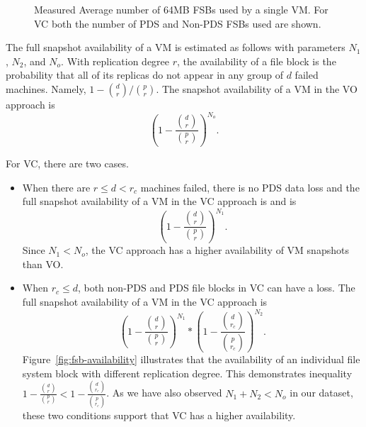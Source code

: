 \begin{figure}[htbp]
  \centering
  \caption{Measured Average number of 64MB FSBs used by a single VM. For VC both the number of PDS and Non-PDS FSBs used are shown.}
  \label{fig:vm-links}
\end{figure}

The full snapshot availability of a VM is estimated as follows with parameters $N_1$, $N_2$, and $N_o$.
With replication degree $r$, the availability of a file block is the probability that  
all of its replicas do not appear in any group of $d$ failed machines. 
Namely, $1-\binom{d}{r}/ \binom{p}{r}$. 
The snapshot availability of a VM  in the VO approach is
\begin{equation}
\label{eq:VO}
(1-\frac{ \binom{d}{r}} { \binom{p}{r} })^{N_o}. 
\end{equation}

For VC, there are two cases.
\begin{itemize}
\item
When there are $r \le d<r_c$ machines failed,  there is no PDS data loss and  
the full snapshot availability of a VM in the VC approach is 
and is
\[
(1-\frac{\binom{d}{r}} { \binom{p}{r} })^{N_1}.
\]
Since $N_1 <N_o$, the VC approach has a higher availability of VM snapshots than VO.

\item
When $r_c \leq d$, both non-PDS and PDS file blocks in VC can have a loss.
The full snapshot availability of  a VM in the VC approach is
\[
(1-\frac{ \binom{d}{r}} { \binom{p}{r} })^{N_1} 
*
(1-\frac{ \binom{d}{r_c}} { \binom{p}{r_c} })^{N_2}.
\]
Figure~\ref{fig:fsb-availability} illustrates that the availability of an individual file system block
with different replication degree. This demonstrates inequality $1-\frac{ \binom{d}{r}} { \binom{p}{r} }
< 1-\frac{ \binom{d}{r_c}} { \binom{p}{r_c} }$. As we have also observed
$N_1+N_2 <N_o$ in our dataset, these two conditions support that VC has a  higher availability. 
\end{itemize} 

